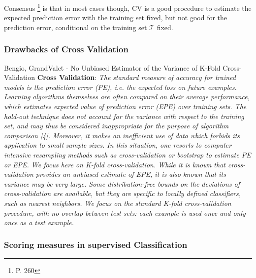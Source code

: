 Consensus \footnote{\cite{hastie-elemstatslearn} P. 260} is that in most cases though, CV is a good procedure to estimate the expected prediction error with the training set fixed, but not good for the prediction error, conditional on the training set $\mathcal{T}$ fixed.

 \subsubsection{Drawbacks of Cross Validation}
 
 Bengio, GrandValet - No Unbiased Estimator of the Variance of K-Fold Cross-Validation
 \textbf{Cross Validation}: 
 \textit{The standard measure of accuracy for trained models is the prediction error (PE), i.e. the expected loss on future examples. Learning algorithms themselves are often compared on their average performance, which estimates expected value of prediction error (EPE) over training sets.
 	The hold-out technique does not account for the variance with respect to the training set, and may thus be considered inappropriate for the purpose of algorithm comparison [4]. Moreover, it makes an inefficient use of data which forbids its application to small sample sizes. In this situation, one resorts to computer intensive resampling methods such as cross-validation or bootstrap to estimate PE or EPE. We focus here on K-fold cross-validation. While it is known that cross-validation provides an unbiased estimate of EPE, it is also known that its variance may be very large.
 	Some distribution-free bounds on the deviations of cross-validation are available, but they are specific to locally defined classifiers, such as nearest neighbors.
 	We focus on the standard K-fold cross-validation procedure, with no overlap between test sets: each example is used once and only once as a test example.
 }

\subsubsection{Scoring measures in supervised Classification}



